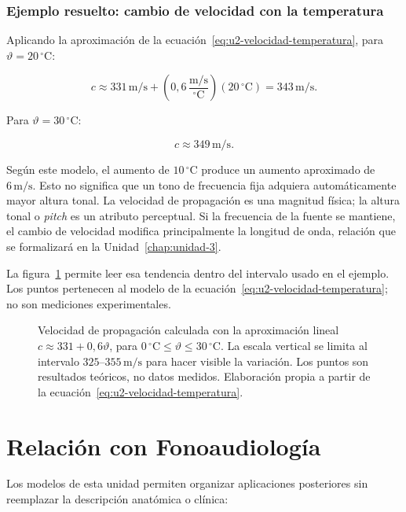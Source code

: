 \subsubsection*{Ejemplo resuelto: cambio de velocidad con la temperatura}

Aplicando la aproximación de la ecuación~\eqref{eq:u2-velocidad-temperatura},
para \(\vartheta=20\,^{\circ}\text{C}\):

\[
    c\approx331\,\text{m}/\text{s}
    +\left(0{,}6\,\frac{\text{m}/\text{s}}{^{\circ}\text{C}}\right)
    (20\,^{\circ}\text{C})
    =343\,\text{m}/\text{s}.
\]

Para \(\vartheta=30\,^{\circ}\text{C}\):

\[
    c\approx349\,\text{m}/\text{s}.
\]

Según este modelo, el aumento de \(10\,^{\circ}\text{C}\) produce un aumento aproximado de \(6\,\text{m}/\text{s}\). Esto no significa que un tono de frecuencia fija adquiera automáticamente mayor altura tonal. La velocidad de propagación es una magnitud física; la altura tonal o \emph{pitch} es un atributo perceptual. Si la frecuencia de la fuente se mantiene, el cambio de velocidad modifica principalmente la longitud de onda, relación que se formalizará en la Unidad~\ref{chap:unidad-3}.

La figura~\ref{fig:u2-velocidad-temperatura} permite leer esa tendencia dentro
del intervalo usado en el ejemplo. Los puntos pertenecen al modelo de la
ecuación~\eqref{eq:u2-velocidad-temperatura}; no son mediciones experimentales.

\begin{figure}[ht]
    \centering
    
    \caption{Velocidad de propagación calculada con la aproximación lineal
    \(c\approx331+0{,}6\vartheta\), para
    \(0\,^{\circ}\text{C}\leq\vartheta\leq
    30\,^{\circ}\text{C}\). La escala vertical se limita al intervalo
    \(325\)--\(355\,\text{m}/\text{s}\) para hacer visible la variación. Los
    puntos son resultados teóricos, no datos medidos. Elaboración propia a
    partir de la ecuación~\eqref{eq:u2-velocidad-temperatura}.}
    \label{fig:u2-velocidad-temperatura}
\end{figure}

\section{Relación con Fonoaudiología}
\label{sec:u2-fonoaudiologia}

Los modelos de esta unidad permiten organizar aplicaciones posteriores sin reemplazar la descripción anatómica o clínica:

